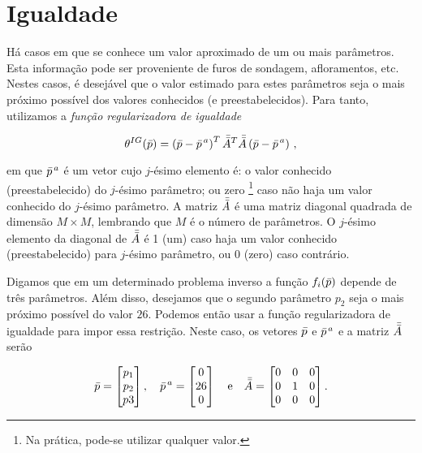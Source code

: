 \section{Igualdade}

Há casos em que se conhece um valor aproximado de um ou mais parâmetros.
Esta informação pode ser proveniente de furos de sondagem, afloramentos, etc.
Nestes casos, é desejável que o valor estimado para estes parâmetros seja o mais
próximo possível dos valores conhecidos (e preestabelecidos).
Para tanto, utilizamos a {\it função regularizadora de igualdade}

\begin{equation}
\theta^{IG}(\bar{p}) =
    \left(\bar{p} - \bar{p}^{\thinspace a}\right)^T \bar{\bar{A}}^T\bar{\bar{A}}
        \left(\bar{p} - \bar{p}^{\thinspace a} \right)
    \thinspace ,
\label{eq:igualdade}
\end{equation}

\noindent em que $\bar{p}^{\thinspace a}$ é um vetor cujo $j$-ésimo elemento é:
o valor conhecido (preestabelecido) do $j$-ésimo parâmetro; ou zero
\footnote{Na prática, pode-se utilizar qualquer valor.} caso não
haja um valor conhecido do $j$-ésimo parâmetro. A matriz $\bar{\bar{A}}$ é uma matriz
diagonal quadrada de dimensão $M \times M$, lembrando que $M$ é o número de
parâmetros.
O $j$-ésimo elemento da diagonal de $\bar{\bar{A}}$ é 1 (um) caso
haja um valor conhecido (preestabelecido) para $j$-ésimo parâmetro, ou 0 (zero)
caso contrário.

\begin{example}
Digamos que em um determinado problema inverso a função
$f_i(\bar{p})$ depende de três parâmetros. Além disso, desejamos que o segundo
parâmetro $p_2$ seja o mais próximo possível do valor $26$.
Podemos então usar a função regularizadora de igualdade para impor essa restrição.
Neste caso, os vetores $\bar{p}$ e $\bar{p}^{\thinspace a}$ e a matriz
$\bar{\bar{A}}$ serão

\[
\bar{p} =
    \begin{bmatrix}
    p_1 \\ p_2 \\ p3
    \end{bmatrix} , \quad
\bar{p}^{\thinspace a} =
    \begin{bmatrix}
    0 \\ 26 \\ 0
    \end{bmatrix} \quad \text{e} \quad
\bar{\bar{A}} = 
    \begin{bmatrix}
    0 & 0 & 0 \\
    0 & 1 & 0 \\
    0 & 0 & 0
    \end{bmatrix} .
\]
\end{example}

